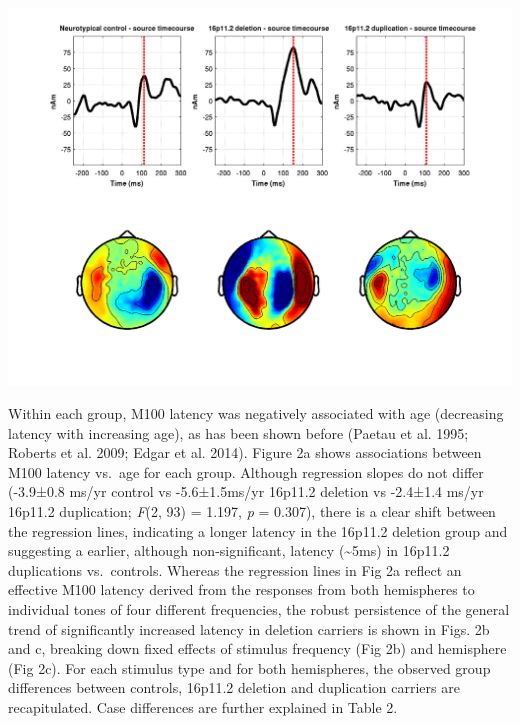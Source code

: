 \documentclass[]{article}
\begin{document}
\includegraphics{figure-1-updated-final.png}

Within each group, M100 latency was negatively associated with age
(decreasing latency with increasing age), as has been shown before
(Paetau et al. 1995; Roberts et al. 2009; Edgar et al. 2014). Figure 2a
shows associations between M100 latency vs.~age for each group. Although
regression slopes do not differ (-3.9±0.8 ms/yr control vs -5.6±1.5ms/yr
16p11.2 deletion vs -2.4±1.4 ms/yr 16p11.2 duplication; \emph{F}(2, 93)
= 1.197, \emph{p} = 0.307), there is a clear shift between the
regression lines, indicating a longer latency in the 16p11.2 deletion
group and suggesting a earlier, although non-significant, latency
(\textasciitilde{}5ms) in 16p11.2 duplications vs.~controls. Whereas the
regression lines in Fig 2a reflect an effective M100 latency derived
from the responses from both hemispheres to individual tones of four
different frequencies, the robust persistence of the general trend of
significantly increased latency in deletion carriers is shown in Figs.
2b and c, breaking down fixed effects of stimulus frequency (Fig 2b) and
hemisphere (Fig 2c). For each stimulus type and for both hemispheres,
the observed group differences between controls, 16p11.2 deletion and
duplication carriers are recapitulated. Case differences are further
explained in Table 2.

\medskip
\end{document}
